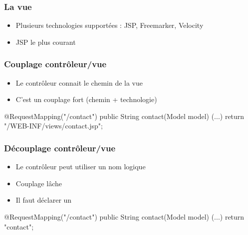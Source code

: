 \begin{frame}[fragile]
 \frametitle{La vue}
 
 \begin{itemize}
  \item Plusieurs technologies supportées : JSP, Freemarker, Velocity
  \item JSP le plus courant
 \end{itemize} 
 

\end{frame}

\begin{frame}[fragile]
 \frametitle{Couplage contrôleur/vue}

 \begin{itemize}
  \item Le contrôleur connait le chemin de la vue
  \item C'est un couplage fort (chemin + technologie)
 \end{itemize}

 \begin{javacode}
@RequestMapping("/contact")
public String contact(Model model) {
  (...)
  return "/WEB-INF/views/contact.jsp";
}
 \end{javacode}

\end{frame}

\begin{frame}[fragile]
 \frametitle{Découplage contrôleur/vue}

 \begin{itemize}
  \item Le contrôleur peut utiliser un nom logique
  \item Couplage lâche
  \item Il faut déclarer un 
 \end{itemize}

 \begin{javacode}
@RequestMapping("/contact")
public String contact(Model model) {
  (...)
  return "contact";
}
 \end{javacode}

\end{frame}

